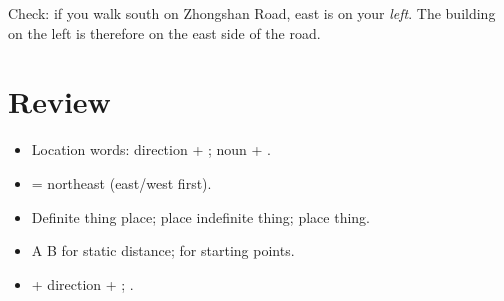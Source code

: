 \begin{aside}
Check: if you walk south on Zhongshan Road, east is on your \emph{left}. The building
on the left is therefore on the east side of the road.
\end{aside}

\section*{Review}
\begin{itemize}
  \item Location words: direction + ; noun + .
  \item {} = northeast (east/west first).
  \item Definite thing  place; place  indefinite thing; place  thing.
  \item A  B  for static distance;  for starting points.
  \item {} + direction + ; .
\end{itemize}

